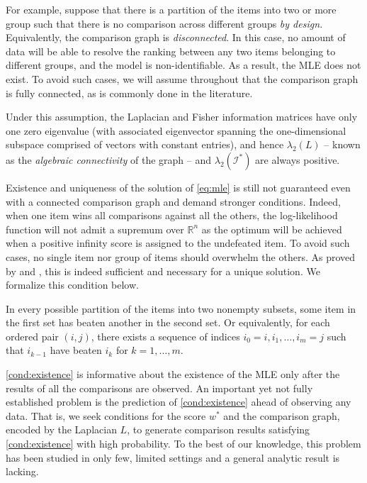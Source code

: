 For example, suppose that there is a partition of the items into two or more group  such that there is no comparison across different groups {\it by design.} Equivalently, the comparison graph is {\it disconnected}. In this case, no amount of data will be able to resolve the  ranking between any two items belonging to different groups, and the model is non-identifiable. As a result, the MLE does not exist. To avoid such cases, we will assume throughout that the comparison graph is fully connected, as is commonly done in the literature. 

Under this assumption, the Laplacian and Fisher information matrices have only one zero eigenvalue (with associated eigenvector spanning the one-dimensional subspace comprised of vectors with constant entries), and hence $\lambda_2(L)$ -- known as the {\it algebraic connectivity} of the graph \citep{brouwer2011spectra} --  and $\lambda_2(\mathcal{I}^*)$ are always positive.  

Existence and uniqueness of the solution of \ref{eq:mle} is still not guaranteed even with a connected comparison graph and demand stronger conditions. Indeed, when one item wins all comparisons against all the others, the log-likelihood function will not admit a supremum over $\mathbb{R}^n$ as the optimum will be achieved when a positive infinity score is assigned to the undefeated item. To avoid such cases, no single item nor group of items should overwhelm the others. As proved by \citet{Zermelo1929} and \citet{ford1957solution},  this is indeed sufficient and necessary for a  unique solution. We formalize this condition below.

\begin{condition} \label{cond:existence} 
In every possible partition of the items into two nonempty subsets, some item in the first set has beaten another in the second set. Or equivalently, for each ordered pair $(i, j)$, there exists a sequence of indices $i_0=i, i_1, \dots, i_m=j$ such that $i_{k-1}$ have beaten $i_k$ for $k=1,\dots,m$.
\end{condition}

\ref{cond:existence}  is informative about the existence of the MLE only after the results of all the comparisons are observed. An important yet not fully established problem is the prediction of \ref{cond:existence} ahead of observing any data. That is, we seek conditions for the score $w^*$ and the comparison graph, encoded by the Laplacian  $L$, to generate comparison results satisfying \ref{cond:existence} with high probability. To the best of our knowledge, this problem has been  studied in only few, limited settings and a general analytic result is lacking.

